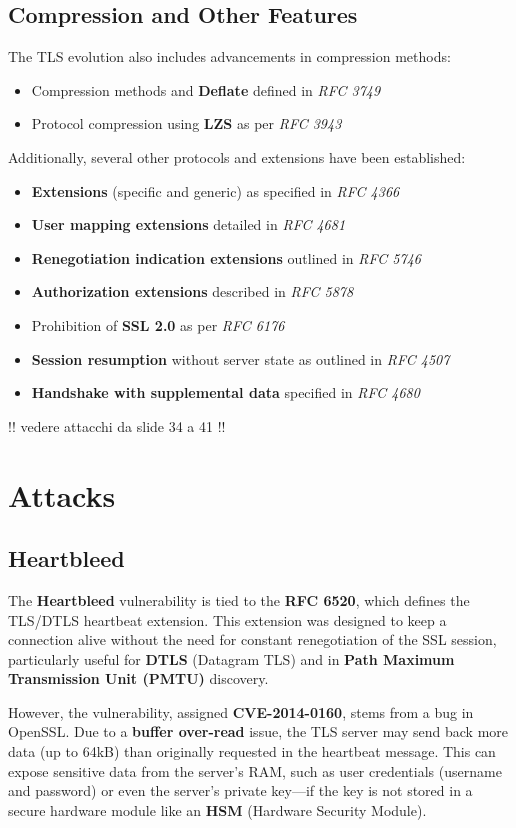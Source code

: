 \subsection{Compression and Other Features} 
The TLS evolution also includes advancements in compression methods: 
\begin{itemize}[itemsep=0pt] 
    \item Compression methods and \textbf{Deflate} defined in \textit{RFC 3749} 
    \item Protocol compression using \textbf{LZS} as per \textit{RFC 3943} 
\end{itemize} Additionally, several other protocols and extensions have been established: 
\begin{itemize}[itemsep=0pt]
        \item \textbf{Extensions} (specific and generic) as specified in \textit{RFC 4366} 
        \item \textbf{User mapping extensions} detailed in \textit{RFC 4681} 
        \item \textbf{Renegotiation indication extensions} outlined in \textit{RFC 5746} 
        \item \textbf{Authorization extensions} described in \textit{RFC 5878} 
        \item Prohibition of \textbf{SSL 2.0} as per \textit{RFC 6176} 
        \item \textbf{Session resumption} without server state as outlined in \textit{RFC 4507} 
        \item \textbf{Handshake with supplemental data} specified in \textit{RFC 4680} 
\end{itemize}


!! vedere attacchi da slide 34 a 41 !!
\section{Attacks}

\subsection{Heartbleed}
The \textbf{Heartbleed} vulnerability is tied to the \textbf{RFC 6520}, which defines the TLS/DTLS heartbeat extension. This extension was designed to keep a connection alive without the need for constant renegotiation of the SSL session, particularly useful for \textbf{DTLS} (Datagram TLS) and in \textbf{Path Maximum Transmission Unit (PMTU)} discovery.

However, the vulnerability, assigned \textbf{CVE-2014-0160}, stems from a bug in OpenSSL. Due to a \textbf{buffer over-read} issue, the TLS server may send back more data (up to 64kB) than originally requested in the heartbeat message. This can expose sensitive data from the server's RAM, such as user credentials (username and password) or even the server's private key—if the key is not stored in a secure hardware module like an \textbf{HSM} (Hardware Security Module).


